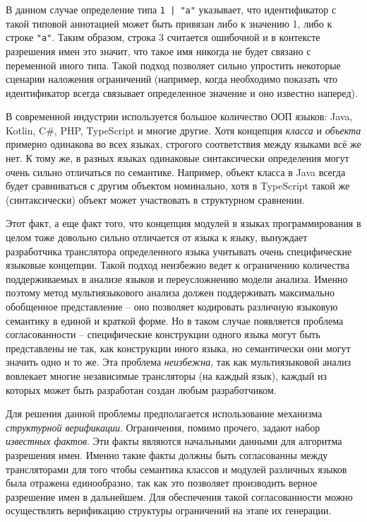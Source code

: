 В данном случае определение типа \texttt{1 | "a"} указывает, что идентификатор с такой типовой аннотацией может быть
привязан либо к значению 1, либо к строке \texttt{"a"}. Таким образом, строка 3 считается ошибочной и в контексте
разрешения имен это значит, что такое имя никогда не будет связано с переменной иного типа. Такой подход позволяет
сильно упростить некоторые сценарии наложения ограничений (например, когда необходимо показать что идентификатор всегда связывает
определенное значение и оно известно наперед).

В современной индустрии используется большое количество ООП языков: Java, Kotlin, C\#, PHP, TypeScript и многие другие.
Хотя концепция \textit{класса} и \textit{объекта} примерно одинакова во всех языках, строгого соответствия между
языками всё же нет. К тому же, в разных языках одинаковые синтаксически определения могут очень сильно отличаться по
семантике. Например, объект класса в Java всегда будет сравниваться с другим объектом номинально, хотя
в TypeScript такой же (синтаксически) объект может участвовать в структурном сравнении.

Этот факт, а еще факт того, что концепция модулей в языках программирования в целом тоже довольно сильно
отличается от языка к языку, вынуждает разработчика транслятора определенного языка учитывать очень
специфические языковые концепции. Такой подход неизбежно ведет к ограничению количества поддерживаемых в анализе языков
и переусложнению модели анализа.
Именно поэтому метод мультиязыкового анализа должен поддерживать максимально
обобщенное представление -- оно позволяет кодировать различную языковую семантику в единой и краткой форме. Но в таком случае
появляется проблема согласованности -- специфические конструкции одного языка могут быть представлены не так, как конструкции иного языка, но
семантически они могут значить одно и то же. Эта проблема \textit{неизбежна}, так как мультиязыковой анализ
 вовлекает многие независимые трансляторы (на каждый язык), каждый из которых может быть разработан создан любым разработчиком. 

Для решения данной проблемы предполагается использование механизма \textit{структурной верификации}. Ограничения, помимо прочего,
задают набор \textit{известных фактов}. Эти факты являются начальными данными для алгоритма разрешения имен. Именно
такие факты должны быть согласованны между трансляторами для того чтобы семантика классов и модулей различных языков
была отражена единообразно, так как это позволяет производить верное разрешение имен в дальнейшем. Для обеспечения такой
согласованности можно осуществлять верификацию структуры ограничений на этапе их генерации.

